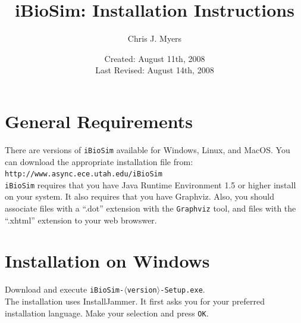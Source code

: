 \documentclass[titlepage,11pt]{article}
\title{iBioSim: Installation Instructions}
\author{Chris J. Myers}
\date{Created: August 11th, 2008\\
  Last Revised: August 14th, 2008
}
\begin{document}
\maketitle

  
\tableofcontents

\clearpage
  

\section{General Requirements}

\noindent
There are versions of {\tt iBioSim} available for Windows, Linux, and
MacOS.  You can download the appropriate installation file from:\\
{\tt http://www.async.ece.utah.edu/iBioSim}
\\ {\tt iBioSim} requires that you have 
Java Runtime Environment 1.5
or higher install on your system.  It also requires that you have 
Graphviz.
Also, you should associate files with a ``.dot'' extension with the 
{\tt Graphviz} tool, and files with the ``.xhtml'' extension to your
web browswer.

\section{Installation on Windows}

\noindent
Download and execute {\tt iBioSim-$\langle$version$\rangle$-Setup.exe}.\\
The installation uses InstallJammer.  It first asks you for your
preferred installation language.  Make your selection and press {\tt OK}.
\end{document}
